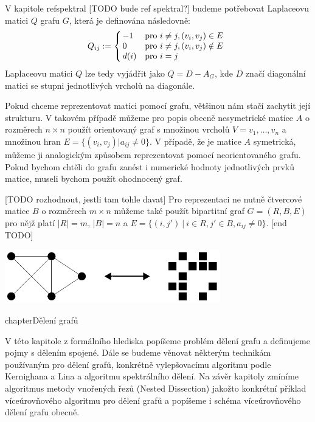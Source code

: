 \documentclass[11pt,american,czech,oneside]{book}
\theoremstyle{plain}
\theoremstyle{definition}
\begin{document}
V kapitole ref{spektral} [TODO bude ref spektral?] budeme potřebovat Laplaceovu matici $Q$ grafu $G$, která je definována následovně:
\[
Q_{ij} :=
\left\{
	\begin{array}{@{\,}ll}
		-1  & \mbox{pro } i \neq j, (v_i,v_j) \in E \\
		0 & \mbox{pro } i \neq j, (v_i,v_j) \notin E\\
        d(i) & \mbox{pro } i = j
	\end{array}
\right.
\]
Laplaceovu matici $Q$ lze tedy vyjádřit jako $Q = D - A_G$, kde $D$  značí diagonální matici se stupni jednotlivých vrcholů na diagonále.

Pokud chceme reprezentovat matici pomocí grafu, většinou nám stačí zachytit její strukturu. V takovém případě můžeme pro popis obecně nesymetrické matice $A$ o rozměrech $n \times n$ použít orientovaný graf s množinou vrcholů $V = {v_1,\ldots,v_n}$ a množinou hran $E =\{(v_i,v_j)|a_{ij}\neq 0\}$. V případě, že je matice $A$ symetrická, můžeme ji analogickým způsobem reprezentovat pomocí neorientovaného grafu.
Pokud bychom chtěli do grafu zanést i numerické hodnoty jednotlivých prvků matice, museli bychom použít ohodnocený graf.

[TODO rozhodnout, jestli tam tohle davat]
Pro reprezentaci ne nutně čtvercové matice $B$ o rozměrech $m\times n$ můžeme také použít bipartitní graf $G=(R,B,E)$ pro nějž platí $|R|=m$, $|B|=n$ a $E = \{(i,j') \ | \ i \in R, j' \in B, a_{ij} \neq 0 \}$.
[end TODO]

\bigskip
{
  \centering
  \includegraphics[width=0.7\textwidth]{pictures/matgr.pdf}
}


chapter{Dělení grafů}

V této kapitole z formálního hlediska popíšeme problém dělení grafu a definujeme pojmy s dělením spojené. Dále se budeme věnovat některým technikám používaným pro dělení grafů, konkrétně vylepšovacímu algoritmu podle Kernighana a Lina a algoritmu spektrálního dělení. Na závěr kapitoly zmíníme algoritmus metody vnořených řezů (Nested Dissection) jakožto konkrétní příklad víceúrovňového algoritmu pro dělení grafů a popíšeme i schéma víceúrovňového dělení grafu obecně.
\end{document}

